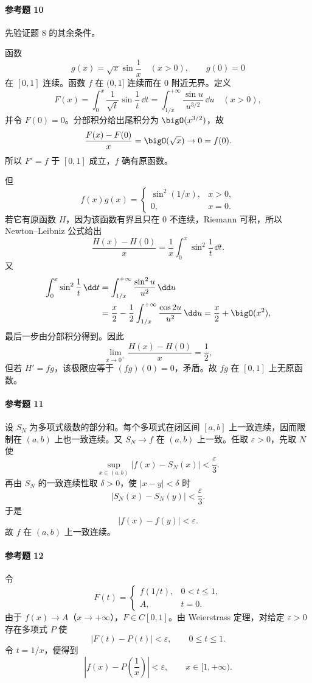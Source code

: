 \paragraph{参考题 10}
\begin{xsolution}
先验证题 8 的其余条件。

函数
\[
  g(x)=\sqrt x\sin\frac1x\quad(x>0),\qquad g(0)=0
\]
在 $[0,1]$ 连续。函数 $f$ 在 $(0,1]$ 连续而在 $0$ 附近无界。定义
\[
  F(x)=\int_0^x\frac1{\sqrt t}\sin\frac1t\,\dd t
  =\int_{1/x}^{+\infty}\frac{\sin u}{u^{3/2}}\,\dd u
  \quad(x>0),
\]
并令 $F(0)=0$。分部积分给出尾积分为 $\bigO(x^{3/2})$，故
\[
  \frac{F(x)-F(0)}x=\bigO(\sqrt x)\to0=f(0).
\]
所以 $F'=f$ 于 $[0,1]$ 成立，$f$ 确有原函数。

但
\[
  f(x)g(x)=
  \begin{cases}
    \sin^2(1/x),&x>0,\\
    0,&x=0.
  \end{cases}
\]
若它有原函数 $H$，因为该函数有界且只在 $0$ 不连续，Riemann 可积，所以 Newton--Leibniz 公式给出
\[
  \frac{H(x)-H(0)}x
  =\frac1x\int_0^x\sin^2\frac1t\,\dd t.
\]
又
\[
\begin{aligned}
  \int_0^x\sin^2\frac1t\,\dd t
  &=\int_{1/x}^{+\infty}\frac{\sin^2u}{u^2}\,\dd u\\
  &=\frac x2-\frac12\int_{1/x}^{+\infty}\frac{\cos2u}{u^2}\,\dd u
  =\frac x2+\bigO(x^2),
\end{aligned}
\]
最后一步由分部积分得到。因此
\[
  \lim_{x\to0^+}\frac{H(x)-H(0)}x=\frac12,
\]
但若 $H'=fg$，该极限应等于 $(fg)(0)=0$，矛盾。故 $fg$ 在 $[0,1]$ 上无原函数。
\end{xsolution}

\paragraph{参考题 11}
\begin{xsolution}
设 $S_N$ 为多项式级数的部分和。每个多项式在闭区间 $[a,b]$ 上一致连续，因而限制在 $(a,b)$ 上也一致连续。又 $S_N\to f$ 在 $(a,b)$ 上一致。任取 $\varepsilon>0$，先取 $N$ 使
\[
  \sup_{x\in(a,b)}|f(x)-S_N(x)|<\frac\varepsilon3.
\]
再由 $S_N$ 的一致连续性取 $\delta>0$，使 $|x-y|<\delta$ 时
\[
  |S_N(x)-S_N(y)|<\frac\varepsilon3.
\]
于是
\[
  |f(x)-f(y)|<\varepsilon.
\]
故 $f$ 在 $(a,b)$ 上一致连续。
\end{xsolution}

\paragraph{参考题 12}
\begin{xsolution}
令
\[
  F(t)=
  \begin{cases}
    f(1/t),&0<t\leqslant1,\\
    A,&t=0.
  \end{cases}
\]
由于 $f(x)\to A$（$x\to+\infty$），$F\in C[0,1]$。由 Weierstrass 定理，对给定 $\varepsilon>0$ 存在多项式 $P$ 使
\[
  |F(t)-P(t)|<\varepsilon,
  \qquad0\leqslant t\leqslant1.
\]
令 $t=1/x$，便得到
\[
  \left|f(x)-P\left(\frac1x\right)\right|<\varepsilon,
  \qquad x\in[1,+\infty).
\]
\end{xsolution}

